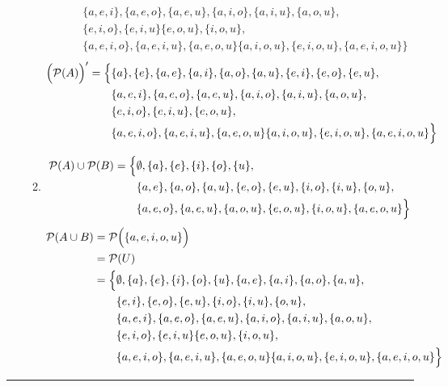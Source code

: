 \documentclass[../notes.tex]{subfiles}
\begin{document}
\begin{enumerate}
\begin{enumerate}[label=(\alph*)]
\begin{align*}
                & \qquad \{a, e, i\}, \{a, e, o\}, \{a, e, u\}, \{a, i, o\}, \{a, i, u\}, \{a, o, u\},\\
                & \qquad \{e, i, o\}, \{e, i, u\} \{e, o, u\}, \{i, o, u\},\\
                & \qquad \{a, e, i, o\}, \{a, e, i, u\}, \{a, e, o, u\} \{a, i, o, u\}, \{e, i, o, u\}, \{a, e, i, o, u\}\Bigr\}
              \end{align*}
              \begin{align*}
                \Bigl(\mathcal{P}(A)\Bigr)' &= \Bigl\{\{a\}, \{e\}, \{a, e\}, \{a, i\}, \{a, o\}, \{a, u\}, \{e, i\}, \{e, o\}, \{e, u\},\\
                & \qquad \{a, e, i\}, \{a, e, o\}, \{a, e, u\}, \{a, i, o\}, \{a, i, u\}, \{a, o, u\}, \\
                & \qquad \{e, i, o\}, \{e, i, u\},  \{e, o, u\}, \\
                & \qquad \{a, e, i, o\}, \{a, e, i, u\}, \{a, e, o, u\} \{a, i, o, u\}, \{e, i, o, u\}, \{a, e, i, o, u\}\Bigr\}
              \end{align*}
            \item
              \begin{align*}
                \mathcal{P}(A) \cup \mathcal{P}(B) &= \Bigl\{\emptyset, \{a\}, \{e\}, \{i\}, \{o\}, \{u\},\\
                & \qquad \{a, e\}, \{a, o\}, \{a, u\}, \{e, o\}, \{e, u\}, \{i, o\}, \{i, u\}, \{o, u\}, \\
                & \qquad \{a, e, o\}, \{a, e, u\}, \{a, o, u\}, \{e, o, u\}, \{i, o, u\}, \{a, e, o, u\}\Bigr\}
              \end{align*}
              \begin{align*}
                \mathcal{P}(A \cup B) &= \mathcal{P}\Bigl(\{a, e, i, o, u\}\Bigr)\\
                &= \mathcal{P}(U)\\
                &= \Bigl\{\emptyset, \{a\}, \{e\}, \{i\}, \{o\}, \{u\}, \{a, e\}, \{a, i\}, \{a, o\}, \{a, u\},\\
                & \qquad \{e, i\}, \{e, o\}, \{e, u\}, \{i, o\}, \{i, u\}, \{o, u\},\\
                & \qquad \{a, e, i\}, \{a, e, o\}, \{a, e, u\}, \{a, i, o\}, \{a, i, u\}, \{a, o, u\},\\
                & \qquad \{e, i, o\}, \{e, i, u\} \{e, o, u\}, \{i, o, u\},\\
                & \qquad \{a, e, i, o\}, \{a, e, i, u\}, \{a, e, o, u\} \{a, i, o, u\}, \{e, i, o, u\}, \{a, e, i, o, u\}\Bigr\}
              \end{align*}
          \end{enumerate}
      \end{enumerate}
      \noindent\rule{\textwidth}{0.4pt}
\end{document}
